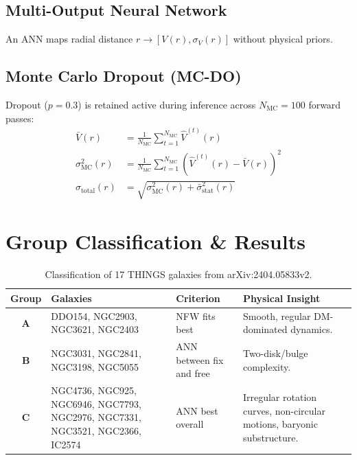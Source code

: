 \documentclass[11pt,a4paper]{article}
\begin{document}
\subsection{Multi-Output Neural Network}
An ANN maps radial distance $r \to [V(r), \sigma_V(r)]$ without physical priors.

\subsection{Monte Carlo Dropout (MC-DO)}
Dropout ($p=0.3$) is retained active during inference across $N_{\text{MC}}=100$ forward passes:
\begin{align}
\bar{V}(r) &= \frac{1}{N_{\text{MC}}} \sum_{t=1}^{N_{\text{MC}}} \hat{V}^{(t)}(r) \\
\sigma_{\text{MC}}^2(r) &= \frac{1}{N_{\text{MC}}} \sum_{t=1}^{N_{\text{MC}}} \left( \hat{V}^{(t)}(r) - \bar{V}(r) \right)^2 \\
\sigma_{\text{total}}(r) &= \sqrt{\sigma_{\text{MC}}^2(r) + \bar{\sigma}_{\text{stat}}^2(r)}
\end{align}

\section{Group Classification \& Results}

\begin{table}[h!]
\centering
\small
\begin{tabular}{c l l p{5cm}}
\toprule
\textbf{Group} & \textbf{Galaxies} & \textbf{Criterion} & \textbf{Physical Insight} \\
\midrule
\textbf{A} & DDO154, NGC2903, NGC3621, NGC2403 & NFW fits best & Smooth, regular DM-dominated dynamics. \\
\textbf{B} & NGC3031, NGC2841, NGC3198, NGC5055 & ANN between fix and free & Two-disk/bulge complexity. \\
\textbf{C} & NGC4736, NGC925, NGC6946, NGC7793, NGC2976, NGC7331, NGC3521, NGC2366, IC2574 & ANN best overall & Irregular rotation curves, non-circular motions, baryonic substructure. \\
\bottomrule
\end{tabular}
\caption{Classification of 17 THINGS galaxies from arXiv:2404.05833v2.}
\end{table}
\end{document}
